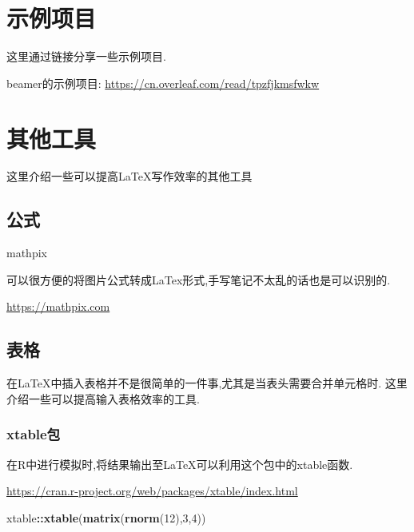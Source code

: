 \documentclass[]{ctexbook}
\newenvironment{Shaded}{\begin{snugshade}}{\end{snugshade}}
\newcommand{\DecValTok}[1]{\textcolor[rgb]{0.00,0.00,0.81}{#1}}
\newcommand{\KeywordTok}[1]{\textcolor[rgb]{0.13,0.29,0.53}{\textbf{#1}}}
\newcommand{\NormalTok}[1]{#1}
\newcommand{\OperatorTok}[1]{\textcolor[rgb]{0.81,0.36,0.00}{\textbf{#1}}}
\begin{document}
\hypertarget{section-14}{%
\chapter{示例项目}\label{section-14}}

这里通过链接分享一些示例项目.

beamer的示例项目:
\url{https://cn.overleaf.com/read/tpzfjkmsfwkw}

\hypertarget{section-15}{%
\chapter{其他工具}\label{section-15}}

这里介绍一些可以提高LaTeX写作效率的其他工具

\hypertarget{section-16}{%
\section{公式}\label{section-16}}

mathpix

可以很方便的将图片公式转成LaTex形式,手写笔记不太乱的话也是可以识别的.

\url{https://mathpix.com}

\hypertarget{section-17}{%
\section{表格}\label{section-17}}

在LaTeX中插入表格并不是很简单的一件事,尤其是当表头需要合并单元格时.
这里介绍一些可以提高输入表格效率的工具.

\hypertarget{xtable}{%
\subsection{xtable包}\label{xtable}}

在R中进行模拟时,将结果输出至LaTeX可以利用这个包中的xtable函数.

\url{https://cran.r-project.org/web/packages/xtable/index.html}

\begin{Shaded}
\begin{Highlighting}[]
\NormalTok{xtable}\OperatorTok{::}\KeywordTok{xtable}\NormalTok{(}\KeywordTok{matrix}\NormalTok{(}\KeywordTok{rnorm}\NormalTok{(}\DecValTok{12}\NormalTok{),}\DecValTok{3}\NormalTok{,}\DecValTok{4}\NormalTok{))}
\end{Highlighting}
\end{Shaded}
\end{document}
